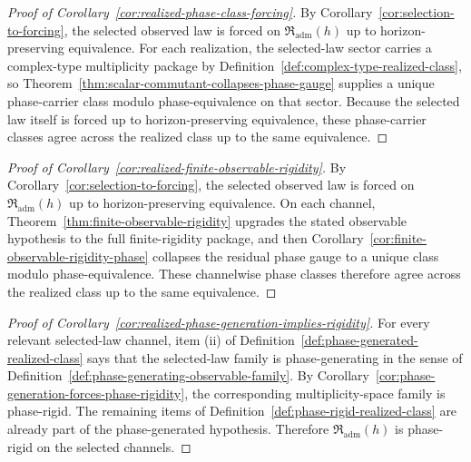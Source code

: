 \begin{proof}[Proof of Corollary~\ref{cor:realized-phase-class-forcing}]
\label{proof:cor:realized-phase-class-forcing}
By Corollary~\ref{cor:selection-to-forcing}, the selected observed law is
forced on $\mathfrak R_{\mathrm{adm}}(h)$ up to horizon-preserving
equivalence. For each realization, the selected-law sector carries a
complex-type multiplicity package by
Definition~\ref{def:complex-type-realized-class}, so
Theorem~\ref{thm:scalar-commutant-collapses-phase-gauge} supplies a unique
phase-carrier class modulo phase-equivalence on that sector. Because the
selected law itself is forced up to horizon-preserving equivalence, these
phase-carrier classes agree across the realized class up to the same
equivalence.
\end{proof}

\begin{proof}[Proof of Corollary~\ref{cor:realized-finite-observable-rigidity}]
\label{proof:cor:realized-finite-observable-rigidity}
By Corollary~\ref{cor:selection-to-forcing}, the selected observed law is
forced on $\mathfrak R_{\mathrm{adm}}(h)$ up to horizon-preserving
equivalence. On each channel,
Theorem~\ref{thm:finite-observable-rigidity} upgrades the stated observable
hypothesis to the full finite-rigidity package, and then
Corollary~\ref{cor:finite-observable-rigidity-phase} collapses the residual
phase gauge to a unique class modulo phase-equivalence. These channelwise
phase classes therefore agree across the realized class up to the same
equivalence.
\end{proof}

\begin{proof}[Proof of Corollary~\ref{cor:realized-phase-generation-implies-rigidity}]
\label{proof:cor:realized-phase-generation-implies-rigidity}
For every relevant selected-law channel, item (ii) of
Definition~\ref{def:phase-generated-realized-class} says that the selected-law
family is phase-generating in the sense of
Definition~\ref{def:phase-generating-observable-family}. By
Corollary~\ref{cor:phase-generation-forces-phase-rigidity}, the corresponding
multiplicity-space family is phase-rigid. The remaining items of
Definition~\ref{def:phase-rigid-realized-class} are already part of the
phase-generated hypothesis. Therefore
$\mathfrak R_{\mathrm{adm}}(h)$ is phase-rigid on the selected channels.
\end{proof}

